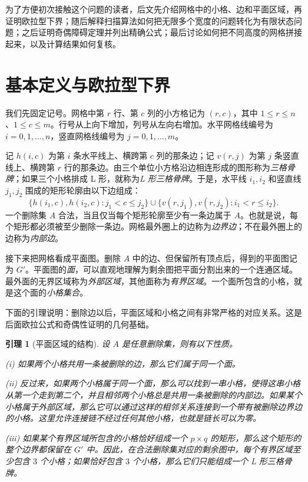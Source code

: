 \documentclass[11pt]{ctexart}
\newtheorem{lemma}[theorem]{引理}
\theoremstyle{definition}
\begin{document}
为了方便初次接触这个问题的读者，后文先介绍网格中的小格、边和平面区域，再证明欧拉型下界；随后解释扫描算法如何把无限多个宽度的问题转化为有限状态问题；之后证明奇偶障碍定理并列出精确公式；最后讨论如何把不同高度的网格拼接起来，以及计算结果如何复核。
\section{基本定义与欧拉型下界}\label{sec:prelim}

我们先固定记号。网格中第 $r$ 行、第 $c$ 列的小方格记为 $(r,c)$，其中
$1\le r\le n$、$1\le c\le m$。行号从上向下增加，列号从左向右增加。水平网格线编号为 $i=0,1,\ldots,n$，竖直网格线编号为 $j=0,1,\ldots,m$。

记 $h(i,c)$ 为第 $i$ 条水平线上、横跨第 $c$ 列的那条边；记 $v(r,j)$ 为第 $j$ 条竖直线上、横跨第 $r$ 行的那条边。由三个单位小方格沿边相连形成的图形称为\emph{三格骨牌}；如果三个小格排成 L 形，就称为\emph{L 形三格骨牌}。于是，水平线 $i_1,i_2$ 和竖直线 $j_1,j_2$ 围成的矩形轮廓由以下边组成：
\[
\{h(i_1,c),h(i_2,c):j_1<c\le j_2\}
\cup
\{v(r,j_1),v(r,j_2):i_1<r\le i_2\}.
\]
一个删除集 $A$ 合法，当且仅当每个矩形轮廓至少有一条边属于 $A$。也就是说，每个矩形都必须被至少删除一条边。网格最外圈上的边称为\emph{边界边}；不在最外圈上的边称为\emph{内部边}。

接下来把网格看成平面图。删除 $A$ 中的边、但保留所有顶点后，得到的平面图记为 $G'$。平面图的\emph{面}，可以直观地理解为剩余图把平面分割出来的一个连通区域。最外面的无界区域称为\emph{外部区域}，其他面称为\emph{有界区域}。一个面所包含的小格，就是这个面的\emph{小格集合}。

下面的引理说明：删除边以后，平面区域和小格之间有非常严格的对应关系。这是后面欧拉公式和奇偶性证明的几何基础。

\begin{lemma}[平面区域的结构]\label{lem:face}
设 $A$ 是任意删除集，则有以下性质。

\emph{(i)} 如果两个小格共用一条被删除的边，那么它们属于同一个面。

\emph{(ii)} 反过来，如果两个小格属于同一个面，那么可以找到一串小格，使得这串小格从第一个走到第二个，并且相邻两个小格总是共用一条被删除的内部边。如果某个小格属于外部区域，那么它可以通过这样的相邻关系连接到一个带有被删除边界边的小格。这里允许连接链不经过任何其他小格，也就是链长可以为零。

\emph{(iii)} 如果某个有界区域所包含的小格恰好组成一个 $p\times q$ 的矩形，那么这个矩形的整个边界都保留在 $G'$ 中。因此，在合法删除集对应的剩余图中，每个有界区域至少包含 $3$ 个小格；如果恰好包含 $3$ 个小格，那么它们只能组成一个 L 形三格骨牌。
\end{lemma}
\end{document}
